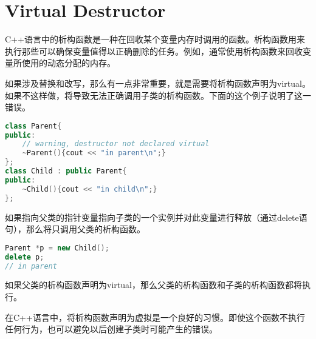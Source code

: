 \section{Virtual Destructor}

C++语言中的析构函数是一种在回收某个变量内存时调用的函数。析构函数用来执行那些可以确保变量值得以正确删除的任务。例如，通常使用析构函数来回收变量所使用的动态分配的内存。

如果涉及替换和改写，那么有一点非常重要，就是需要将析构函数声明为virtual。如果不这样做，将导致无法正确调用子类的析构函数。下面的这个例子说明了这一错误。


\begin{lstlisting}[language=C++]
class Parent{
public:
	// warning, destructor not declared virtual
	~Parent(){cout << "in parent\n";}
};
class Child : public Parent{
public:
	~Child(){cout << "in child\n";}
};
\end{lstlisting}

如果指向父类的指针变量指向子类的一个实例并对此变量进行释放（通过delete语句），那么将只调用父类的析构函数。



\begin{lstlisting}[language=C++]
Parent *p = new Child();
delete p;
// in parent
\end{lstlisting}


如果父类的析构函数声明为virtual，那么父类的析构函数和子类的析构函数都将执行。

在C++语言中，将析构函数声明为虚拟是一个良好的习惯。即使这个函数不执行任何行为，也可以避免以后创建子类时可能产生的错误。


\begin{lstlisting}[language=C++]

\end{lstlisting}





\begin{lstlisting}[language=C++]

\end{lstlisting}


































